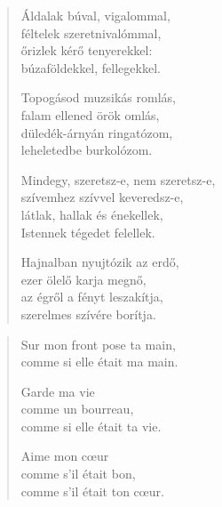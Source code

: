 \documentclass[11pt]{extbook}
\newcommand*{\centeredornament}{\centerline{\pgfornament[width=6cm]{88}}}
\begin{document}
\newpage

\vspace*{-15mm}
\centeredornament



\begin{verse}
  Áldalak búval, vigalommal, \\
  féltelek szeretnivalómmal, \\
  őrizlek kérő tenyerekkel: \\
  búzaföldekkel, fellegekkel.

  Topogásod muzsikás romlás, \\
  falam ellened örök omlás, \\
  düledék-árnyán ringatózom, \\
  leheletedbe burkolózom.

  Mindegy, szeretsz-e, nem szeretsz-e, \\
  szívemhez szívvel keveredsz-e, \\
  látlak, hallak és énekellek, \\
  Istennek tégedet felellek.

  Hajnalban nyujtózik az erdő, \\
  ezer ölelő karja megnő, \\
  az égről a fényt leszakítja, \\
  szerelmes szívére borítja.
\end{verse}

\newpage


\vspace*{-15mm}
\centeredornament



\begin{verse}
  Sur mon front pose ta main, \\
  comme si elle était ma main.

  Garde ma vie \\
  comme un bourreau, \\
  comme si elle était ta vie.

  Aime mon cœur \\
  comme s'il était bon, \\
  comme s'il était ton cœur.
\end{verse}
\end{document}
